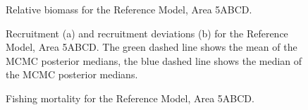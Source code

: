\documentclass[11pt]{book}
\begin{document}
\begin{figure}[htb]

{\centering {} 

}

\caption{Relative biomass for the Reference Model, Area 5ABCD.}\label{fig:fig-base-depl-5abcd}
\end{figure}
\begin{figure}[htb]

{\centering {} 

}

\caption{Recruitment (a) and recruitment deviations (b) for the Reference Model, Area 5ABCD.  The green dashed line shows the mean of the MCMC posterior medians, the blue dashed line shows the median of the MCMC posterior medians.}\label{fig:fig-base-recr-5abcd}
\end{figure}
\begin{figure}[htb]

{\centering {} 

}

\caption{Fishing mortality for the Reference Model, Area 5ABCD.}\label{fig:fig-base-f-5abcd}
\end{figure}
\clearpage
\end{document}
